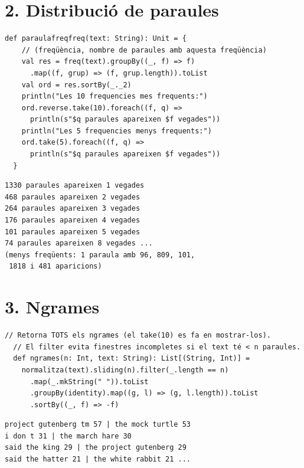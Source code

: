 \documentclass[10pt,a4paper,twocolumn]{article}
\begin{document}
\section*{2. Distribució de paraules}
\begin{lstlisting}[style=scalastyle]
  def paraulafreqfreq(text: String): Unit = {
    // (freqüència, nombre de paraules amb aquesta freqüència)
    val res = freq(text).groupBy((_, f) => f)
      .map((f, grup) => (f, grup.length)).toList
    val ord = res.sortBy(_._2)
    println("Les 10 frequencies mes frequents:")
    ord.reverse.take(10).foreach((f, q) =>
      println(s"$q paraules apareixen $f vegades"))
    println("Les 5 frequencies menys frequents:")
    ord.take(5).foreach((f, q) =>
      println(s"$q paraules apareixen $f vegades"))
  }
\end{lstlisting}
\begin{lstlisting}[style=outputstyle]
1330 paraules apareixen 1 vegades
468 paraules apareixen 2 vegades
264 paraules apareixen 3 vegades
176 paraules apareixen 4 vegades
101 paraules apareixen 5 vegades
74 paraules apareixen 8 vegades ...
(menys freqüents: 1 paraula amb 96, 809, 101,
 1818 i 481 aparicions)
\end{lstlisting}

\section*{3. Ngrames}
\begin{lstlisting}[style=scalastyle]
  // Retorna TOTS els ngrames (el take(10) es fa en mostrar-los).
  // El filter evita finestres incompletes si el text té < n paraules.
  def ngrames(n: Int, text: String): List[(String, Int)] =
    normalitza(text).sliding(n).filter(_.length == n)
      .map(_.mkString(" ")).toList
      .groupBy(identity).map((g, l) => (g, l.length)).toList
      .sortBy((_, f) => -f)
\end{lstlisting}
\begin{lstlisting}[style=outputstyle]
project gutenberg tm 57 | the mock turtle 53
i don t 31 | the march hare 30
said the king 29 | the project gutenberg 29
said the hatter 21 | the white rabbit 21 ...
\end{lstlisting}

\end{document}
